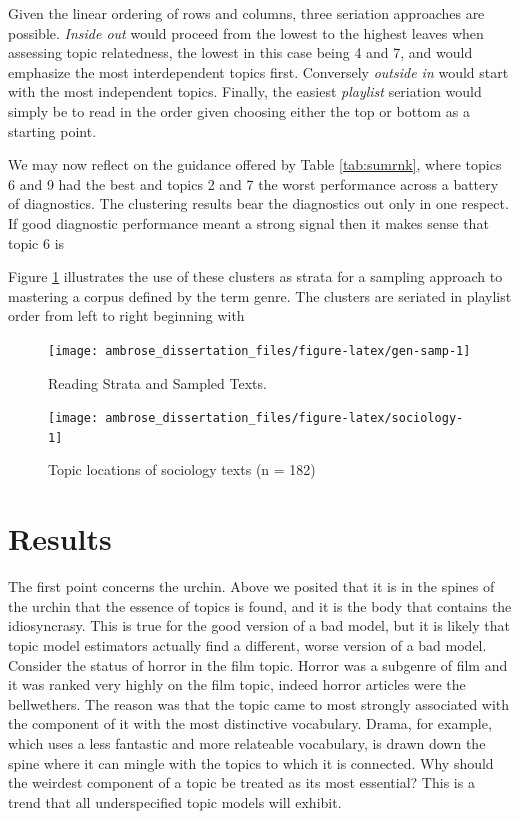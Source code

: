 \documentclass[]{book}
\theoremstyle{definition}
\theoremstyle{definition}
\theoremstyle{definition}
\theoremstyle{remark}
\begin{document}
Given the linear ordering of rows and columns, three seriation
approaches are possible. \emph{Inside out} would proceed from the lowest
to the highest leaves when assessing topic relatedness, the lowest in
this case being 4 and 7, and would emphasize the most interdependent
topics first. Conversely \emph{outside in} would start with the most
independent topics. Finally, the easiest \emph{playlist} seriation would
simply be to read in the order given choosing either the top or bottom
as a starting point.

We may now reflect on the guidance offered by Table \ref{tab:sumrnk},
where topics 6 and 9 had the best and topics 2 and 7 the worst
performance across a battery of diagnostics. The clustering results bear
the diagnostics out only in one respect. If good diagnostic performance
meant a strong signal then it makes sense that topic 6 is

Figure \ref{fig:gen-samp} illustrates the use of these clusters as
strata for a sampling approach to mastering a corpus defined by the term
genre. The clusters are seriated in playlist order from left to right
beginning with

\begin{figure}

{\centering \texttt{[image: ambrose\_dissertation\_files/figure-latex/gen-samp-1]} 

}

\caption{Reading Strata and Sampled Texts.}\label{fig:gen-samp}
\end{figure}

\begin{figure}

{\centering \texttt{[image: ambrose\_dissertation\_files/figure-latex/sociology-1]} 

}

\caption{Topic locations of sociology texts (n = 182)}\label{fig:sociology}
\end{figure}

\hypertarget{results-1}{%
\section{Results}\label{results-1}}

The first point concerns the urchin. Above we posited that it is in the
spines of the urchin that the essence of topics is found, and it is the
body that contains the idiosyncrasy. This is true for the good version
of a bad model, but it is likely that topic model estimators actually
find a different, worse version of a bad model. Consider the status of
horror in the film topic. Horror was a subgenre of film and it was
ranked very highly on the film topic, indeed horror articles were the
bellwethers. The reason was that the topic came to most strongly
associated with the component of it with the most distinctive
vocabulary. Drama, for example, which uses a less fantastic and more
relateable vocabulary, is drawn down the spine where it can mingle with
the topics to which it is connected. Why should the weirdest component
of a topic be treated as its most essential? This is a trend that all
underspecified topic models will exhibit.
\end{document}
